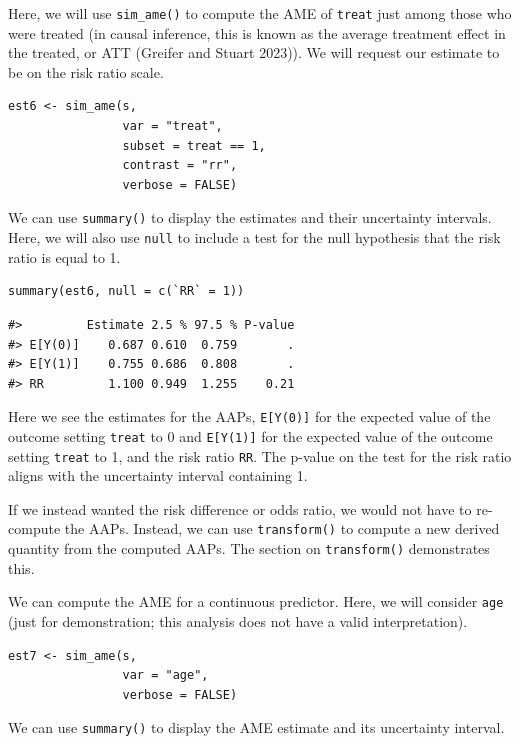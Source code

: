 Here, we will use \texttt{sim\_ame()} to compute the AME of \texttt{treat} just among those who were treated (in causal inference, this is known as the average treatment effect in the treated, or ATT (Greifer and Stuart 2023)). We will request our estimate to be on the risk ratio scale.

\begin{verbatim}
est6 <- sim_ame(s,
                var = "treat",
                subset = treat == 1,
                contrast = "rr",
                verbose = FALSE)
\end{verbatim}

We can use \texttt{summary()} to display the estimates and their uncertainty intervals. Here, we will also use \texttt{null} to include a test for the null hypothesis that the risk ratio is equal to 1.

\begin{verbatim}
summary(est6, null = c(`RR` = 1))
\end{verbatim}

\begin{verbatim}
#>         Estimate 2.5 % 97.5 % P-value
#> E[Y(0)]    0.687 0.610  0.759       .
#> E[Y(1)]    0.755 0.686  0.808       .
#> RR         1.100 0.949  1.255    0.21
\end{verbatim}

Here we see the estimates for the AAPs, \texttt{E{[}Y(0){]}} for the expected value of the outcome setting \texttt{treat} to 0 and \texttt{E{[}Y(1){]}} for the expected value of the outcome setting \texttt{treat} to 1, and the risk ratio \texttt{RR}. The p-value on the test for the risk ratio aligns with the uncertainty interval containing 1.

If we instead wanted the risk difference or odds ratio, we would not have to re-compute the AAPs. Instead, we can use \texttt{transform()} to compute a new derived quantity from the computed AAPs. The section on \texttt{transform()} demonstrates this.

We can compute the AME for a continuous predictor. Here, we will consider \texttt{age} (just for demonstration; this analysis does not have a valid interpretation).

\begin{verbatim}
est7 <- sim_ame(s,
                var = "age",
                verbose = FALSE)
\end{verbatim}

We can use \texttt{summary()} to display the AME estimate and its uncertainty interval.

